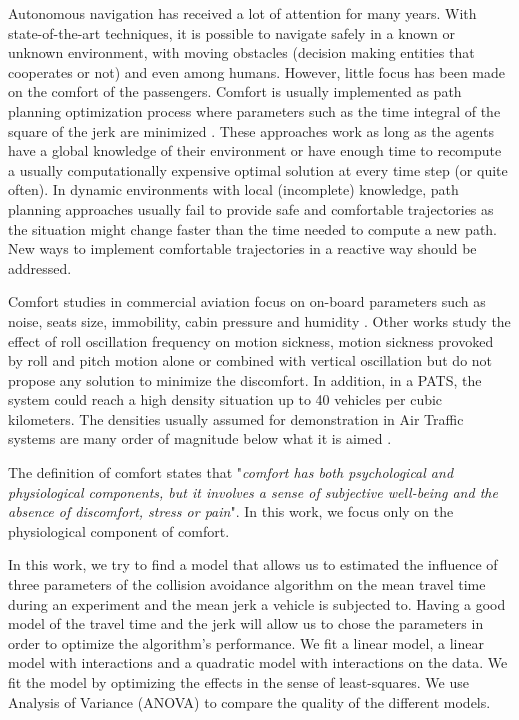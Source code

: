 Autonomous navigation has received a lot of attention for many years. With state-of-the-art techniques, it is possible to navigate safely in a known or unknown environment\cite{scherer_flying_2008}, with moving obstacles (decision making entities that cooperates or not\cite{nordlund_probabilistic_2011}) and even among humans\cite{guzzi_human-friendly_2013}. However, little focus has been made on the comfort of the passengers. Comfort is usually implemented as path planning optimization process where parameters such as the time integral of the square of the jerk are minimized \cite{gulati_framework_2009} \cite{morales_human-comfortable_2013}. These approaches work as long as the agents have a global knowledge of their environment or have enough time to recompute a usually computationally expensive optimal solution at every time step (or quite often). In dynamic environments with local (incomplete) knowledge, path planning approaches usually fail to provide safe and comfortable trajectories as the situation might change faster than the time needed to compute a new path. New ways to implement comfortable trajectories in a reactive way should be addressed. 

Comfort studies in commercial aviation focus on on-board parameters such as noise, seats size, immobility, cabin pressure and humidity \cite{hinninghofen_passenger_2006}. Other works study the effect of roll oscillation frequency on motion sickness\cite{howarth_effect_2003}, motion sickness provoked by roll and pitch motion alone or combined with vertical oscillation\cite{mccauley_motion_1976} \cite{turner_airsickness_2000} but do not propose any solution to minimize the discomfort. In addition, in a PATS, the system could reach a high density situation up to 40 vehicles per cubic kilometers\cite{truman_out_2007}. The densities usually assumed for demonstration in Air Traffic systems are many order of magnitude below what it is aimed\cite{krozel_system_2001} \cite{dowek_provably_2005}. 


The definition of comfort states that "\textit{comfort has both psychological and physiological components, but it involves a sense of subjective well-being and the absence of discomfort, stress or pain}"\cite{richards_psychology_1980}. In this work, we focus only on the physiological component of comfort. 

In this work, we try to find a model that allows us to estimated the influence of three parameters of the collision avoidance algorithm on the mean travel time during an experiment and the mean jerk a vehicle is subjected to. Having a good model of the travel time and the jerk will allow us to chose the parameters in order to optimize the algorithm's performance. We fit a linear model, a linear model with interactions and a quadratic model with interactions on the data. We fit the model by optimizing the effects in the sense of least-squares.
We use Analysis of Variance (ANOVA) to compare the quality of the different models.
